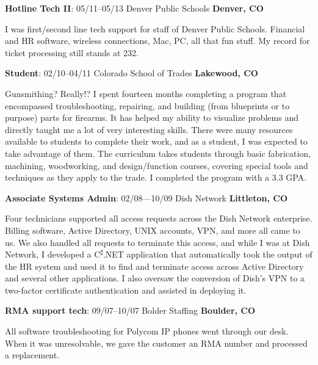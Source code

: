\documentclass[a4paper,12pt]{article}
\begin{document}
\begin{flushleft}
\textbf{Hotline Tech II}: 05/11--05/13 Denver Public Schools \textbf{Denver, CO}
\end{flushleft}

I was first/second line tech support for staff of Denver Public Schools.
Financial and HR software, wireless connections, Mac, PC, all that fun stuff.
My record for ticket processing still stands at 232.

\begin{flushleft}
\textbf{Student}: 02/10--04/11 Colorado School of Trades \textbf{Lakewood, CO}
\end{flushleft}

Gunsmithing? Really!? I spent fourteen months completing a program that
encompassed troubleshooting, repairing, and building (from blueprints or to
purpose) parts for firearms. It has helped my ability to visualize problems
and directly taught me a lot of very interesting skills. There were many
resources available to students to complete their work, and as a student, I
was expected to take advantage of them. The curriculum takes students through
basic fabrication, machining, woodworking, and design/function courses,
covering special tools and techniques as they apply to the trade. I completed
the program with a 3.3 GPA.

\begin{flushleft}
\textbf{Associate Systems Admin}: 02/08---10/09 Dish Network
\textbf{Littleton, CO}
\end{flushleft}

Four technicians supported all access requests across the Dish Network
enterprise. Billing software, Active Directory, UNIX accounts, VPN, and more
all came to us. We also handled all requests to terminate this access, and
while I was at Dish Network, I developed a C\textsuperscript{{$\sharp$}}.NET
application that automatically took the output of the HR system and used it to
find and terminate access across Active Directory and several other
applications. I also oversaw the conversion of Dish's VPN to a two-factor
certificate authentication and assisted in deploying it.

\begin{flushleft}
\textbf{RMA support tech}: 09/07--10/07 Bolder Staffing \textbf{Boulder, CO}
\end{flushleft}

All software troubleshooting for Polycom IP phones went through our desk. When
it was unresolvable, we gave the customer an RMA number and processed a
replacement.
\end{document}
